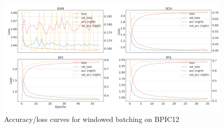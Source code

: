 \begin{figure}[!htb]
    \centering
    \includegraphics[width=\textwidth]{gfx/bpic2012/windowed_loss_acc_curve.png}
    \caption{Accuracy/loss curves for windowed batching on BPIC12}
\end{figure}
\FloatBarrier

